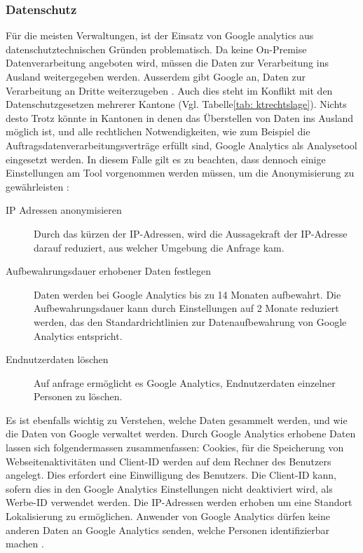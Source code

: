 \subsubsection{Datenschutz}
Für die meisten Verwaltungen, ist der Einsatz von Google analytics aus datenschutztechnischen Gründen problematisch. Da keine On-Premise Datenverarbeitung angeboten wird, müssen die Daten zur Verarbeitung ins Ausland weitergegeben werden. Ausserdem gibt Google an, Daten zur Verarbeitung an Dritte weiterzugeben \parencite{GoogleInfoSharing}. Auch dies steht im Konflikt mit den Datenschutzgesetzen mehrerer Kantone (Vgl. Tabelle\ref{tab: ktrechtslage}). Nichts desto Trotz könnte in Kantonen in denen das Überstellen von Daten ins Ausland möglich ist, und alle rechtlichen Notwendigkeiten, wie zum Beispiel die Auftragsdatenverarbeitungsverträge erfüllt sind, Google Analytics als Analysetool eingesetzt werden. In diesem Falle gilt es zu beachten, dass dennoch einige Einstellungen am Tool vorgenommen werden müssen, um die Anonymisierung zu gewährleisten \parencite{GoogleAnalyticsDatenschutzEinstellungen}: 

\begin{description}
  \item[IP Adressen anonymisieren] Durch das kürzen der IP-Adressen, wird die Aussagekraft der IP-Adresse darauf reduziert, aus welcher Umgebung die Anfrage kam.
  \item[Aufbewahrungsdauer erhobener Daten festlegen] Daten werden bei Google Analytics bis zu 14 Monaten aufbewahrt. Die Aufbewahrungsdauer kann durch Einstellungen auf 2 Monate reduziert werden, das den Standardrichtlinien zur Datenaufbewahrung von Google Analytics entspricht.
  \item[Endnutzerdaten löschen] Auf anfrage ermöglicht es Google Analytics, Endnutzerdaten einzelner Personen zu löschen.   
\end{description} 

Es ist ebenfalls wichtig zu Verstehen, welche Daten gesammelt werden, und wie die Daten von Google verwaltet werden. Durch Google Analytics erhobene Daten lassen sich folgendermassen zusammenfassen: Cookies, für die Speicherung von Webseitenaktivitäten und Client-ID werden auf dem Rechner des Benutzers angelegt. Dies erfordert eine Einwilligung des Benutzers. Die Client-ID kann, sofern dies in den Google Analytics Einstellungen nicht deaktiviert wird, als Werbe-ID verwendet werden. Die IP-Adressen werden erhoben um eine Standort Lokalisierung zu ermöglichen. Anwender von Google Analytics dürfen keine anderen Daten an Google Analytics senden, welche Personen identifizierbar machen \parencite{GoogleAnalyticsDatenschutz}.

